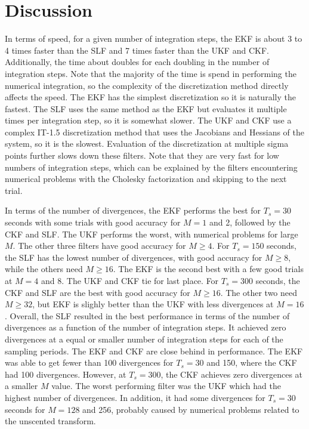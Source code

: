 \documentclass[../zhang_thesis.tex]{subfiles}
\begin{document}
\chapter{Discussion}


In terms of speed, for a given number of integration steps, the EKF is about 3 to 4 times faster than the SLF and 7 times faster than the UKF and CKF. Additionally, the time about doubles for each doubling in the number of integration steps. Note that the majority of the time is spend in performing the numerical integration, so the complexity of the discretization method directly affects the speed. The EKF has the simplest discretization so it is naturally the fastest. The SLF uses the
same method as the EKF but evaluates it multiple times per integration step, so it is somewhat slower. The UKF and CKF use a complex IT-1.5 discretization method that uses the Jacobians and Hessians of the system, so it is the slowest. Evaluation of the discretization at multiple sigma points further slows down these filters. Note that they are very fast for low numbers of integration steps, which can be explained by the filters encountering numerical problems with the Cholesky factorization
and skipping to the next trial.

In terms of the number of divergences, the EKF performs the best for $T_s=30$ seconds with some trials with good accuracy for $M=1$ and 2, followed by the CKF and SLF. The UKF performs the worst, with numerical problems for large $M$. The other three filters have good accuracy for $M\ge 4$. For $T_s=150$ seconds, the SLF has the lowest number of divergences, with good accuracy for $M\ge 8$, while the others need $M\ge 16$. The EKF is the second best with a few good trials at $M=4$ and 8.
The UKF and CKF tie for last place. For $T_s=300$ seconds, the CKF and SLF are the best with good accuracy for $M\ge 16$. The other two need $M\ge 32$, but EKF is slighly better than the UKF with less divergences at $M=16$. Overall, the SLF resulted in the best performance in terms of the number of divergences as a function of the number of integration steps. It achieved zero divergences at a equal or smaller number of integration steps for each of the sampling periods. The EKF and
CKF are close behind in performance. The EKF was able to get fewer than 100 divergences for $T_s=30$ and 150, where the CKF had 100 divergences. However, at $T_s=300$, the CKF achieves zero divergences at a smaller $M$ value. The worst performing filter was the UKF which had the highest number of divergences. In addition, it had some divergences for $T_s=30$ seconds for $M=128$ and 256, probably caused by numerical problems related to the unscented transform.
\end{document}
